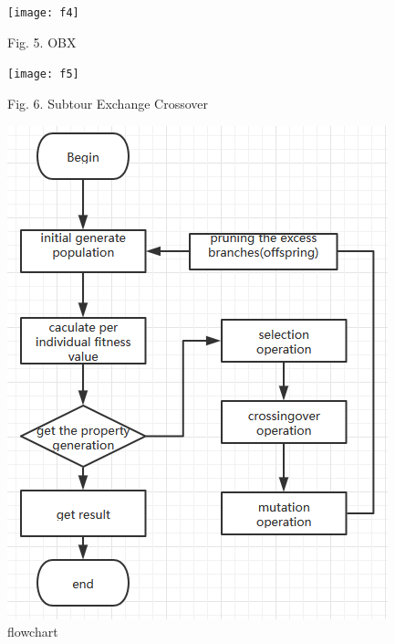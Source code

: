 \documentclass[12pt]{article}
\begin{document}
\begin{figure}[h]
	\centering
	\texttt{[image: f4]}
	\caption{Fig. 5. OBX}
\end{figure}

\begin{figure}[h]
	\centering
	\texttt{[image: f5]}
	\caption{Fig. 6. Subtour Exchange Crossover}
\end{figure}


\begin{figure}[h]
	\centering
	\includegraphics{flowchart1}
	\caption{flowchart}
\end{figure}


%
%
\end{document}
